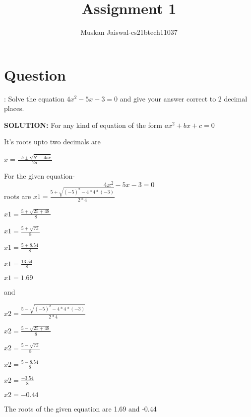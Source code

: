 \documentclass[12pt,two column]{article}
\begin{document}
\title{ Assignment 1}
\author{Muskan Jaiswal-cs21btech11037}

\maketitle



\section{Question }:  Solve the equation $4x^2-5x-3=0$ and give your answer correct to 2 decimal places.



\textbf{SOLUTION:}     For any kind of equation of the form  $ax^2+bx+c=0$

It's roots upto two decimals  are


$x=\frac{-b\pm\sqrt{b^2-4ac}}{2a}$

For the given equation-
\begin{equation}
    4x^2-5x-3=0
\end{equation}
roots are $x1=\frac{5+\sqrt{(-5)^2-4*4*(-3)}}{2*4}
$


$x1=\frac{5+\sqrt{25+48}}{8}
$

$x1=\frac{5+\sqrt{73}}{8}
$

$x1=\frac{5+8.54}{8}
$

$x1=\frac{13.54}{8}
$

$x1=1.69
$


and

$x2=\frac{5-\sqrt{(-5)^2-4*4*(-3)}}{2*4}
$

$x2=\frac{5-\sqrt{25+48}}{8}
$

$x2=\frac{5-\sqrt{73}}{8}
$

$x2=\frac{5-8.54}{8}
$

$x2=\frac{-3.54}{8}
$

$x2=-0.44
$

The roots of the given equation are 1.69 and -0.44
\end{document}
